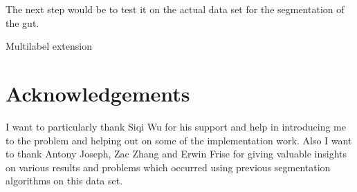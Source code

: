 \documentclass{article} %
\begin{document}
The next step would be to test it on the actual data set for the segmentation of the gut. 

Multilabel extension

\section{Acknowledgements}
I want to particularly thank Siqi Wu for his support and help in introducing me to the problem and helping out on some of the implementation work. Also I want to thank Antony Joseph, Zac Zhang and Erwin Frise for giving valuable insights on various results and problems which occurred using previous segmentation algorithms on this data set.

\FloatBarrier
\vskip 0.2in
\nocite{*}



\begin{appendices}

\end{appendices}
\end{document}
